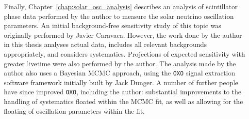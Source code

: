 Finally, Chapter~\ref{chap:solar_osc_analysis} describes an analysis of scintillator phase data performed by the author to measure the solar neutrino oscillation parameters. An initial background-free sensitivity study of this topic was originally performed by Javier Caravaca. However, the work done by the author in this thesis analyses actual data, includes all relevant backgrounds appropriately, and considers systematics. Projections of expected sensitivity with greater livetime were also performed by the author. The analysis made by the author also uses a Bayesian MCMC approach, using the \texttt{OXO} signal extraction software framework initially built by Jack Dunger. A number of further people have since improved \texttt{OXO}, including the author: substantial improvements to the handling of systematics floated within the MCMC fit, as well as allowing for the floating of oscillation parameters within the fit.